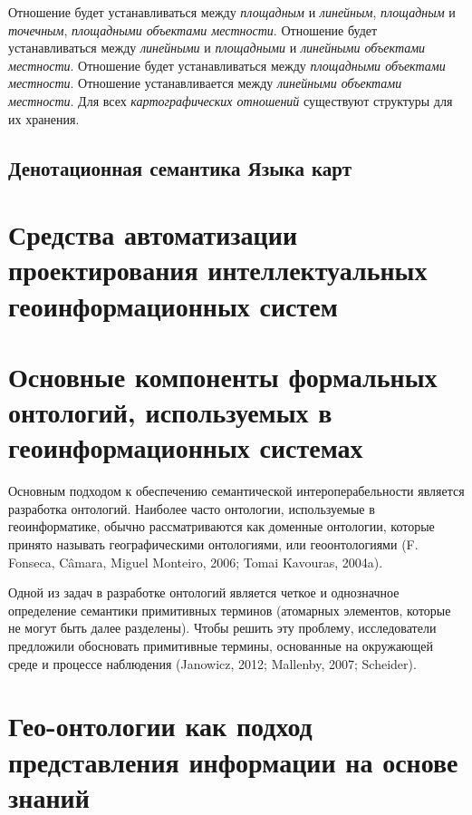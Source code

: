 Отношение  будет устанавливаться между \textit{площадным} и \textit{линейным}, \textit{площадным} и \textit{точечным}, \textit{площадными объектами местности}. Отношение  будет устанавливаться между \textit{линейными} и \textit{площадными} и \textit{линейными объектами местности}. Отношение  будет устанавливаться между \textit{площадными объектами местности}. Отношение  устанавливается между \textit{линейными объектами местности}. Для всех \textit{картографических отношений} существуют структуры для их хранения.

\subsection{Денотационная семантика Языка карт}
\label{chapter_gis_sec_map_semantics}

\section{Средства автоматизации проектирования интеллектуальных геоинформационных систем}
\label{chapter_gis_sec_automatization}

\section{Основные компоненты формальных онтологий, используемых в геоинформационных системах}

Основным подходом к обеспечению семантической интероперабельности является разработка онтологий.
Наиболее часто онтологии, используемые в геоинформатике, обычно рассматриваются как доменные онтологии, которые принято называть географическими онтологиями, или геоонтологиями (F. Fonseca, Câmara, Miguel Monteiro, 2006; Tomai  Kavouras, 2004a). 

Одной из задач в разработке онтологий является четкое и однозначное определение семантики примитивных терминов (атомарных элементов, которые не могут быть далее разделены). Чтобы решить эту проблему, исследователи предложили обосновать примитивные термины, основанные на окружающей среде и процессе наблюдения (Janowicz, 2012; Mallenby, 2007; Scheider).

\section{Гео-онтологии как подход представления информации на основе знаний}

